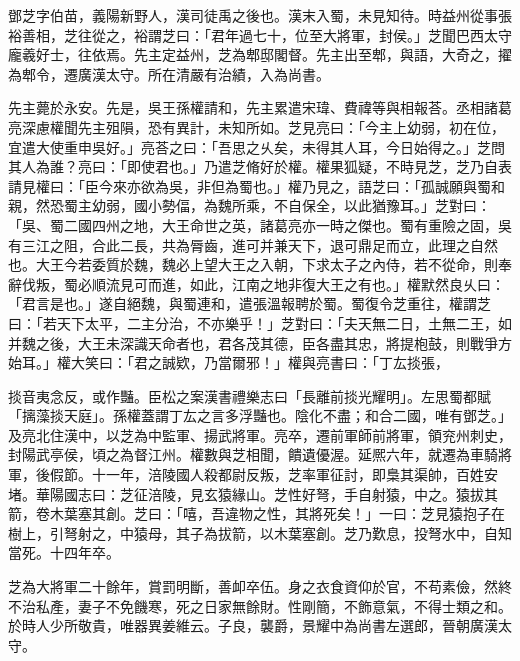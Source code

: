 
\begin{pinyinscope}
鄧芝字伯苗，義陽新野人，漢司徒禹之後也。漢末入蜀，未見知待。時益州從事張裕善相，芝往從之，裕謂芝曰：「君年過七十，位至大將軍，封侯。」芝聞巴西太守龐羲好士，往依焉。先主定益州，芝為郫邸閣督。先主出至郫，與語，大奇之，擢為郫令，遷廣漢太守。所在清嚴有治績，入為尚書。

先主薨於永安。先是，吳王孫權請和，先主累遣宋瑋、費禕等與相報荅。丞相諸葛亮深慮權聞先主殂隕，恐有異計，未知所如。芝見亮曰：「今主上幼弱，初在位，宜遣大使重申吳好。」亮荅之曰：「吾思之乆矣，未得其人耳，今日始得之。」芝問其人為誰？亮曰：「即使君也。」乃遣芝脩好於權。權果狐疑，不時見芝，芝乃自表請見權曰：「臣今來亦欲為吳，非但為蜀也。」權乃見之，語芝曰：「孤誠願與蜀和親，然恐蜀主幼弱，國小勢偪，為魏所乘，不自保全，以此猶豫耳。」芝對曰：「吳、蜀二國四州之地，大王命世之英，諸葛亮亦一時之傑也。蜀有重險之固，吳有三江之阻，合此二長，共為脣齒，進可并兼天下，退可鼎足而立，此理之自然也。大王今若委質於魏，魏必上望大王之入朝，下求太子之內侍，若不從命，則奉辭伐叛，蜀必順流見可而進，如此，江南之地非復大王之有也。」權默然良乆曰：「君言是也。」遂自絕魏，與蜀連和，遣張溫報聘於蜀。蜀復令芝重往，權謂芝曰：「若天下太平，二主分治，不亦樂乎！」芝對曰：「夫天無二日，土無二王，如并魏之後，大王未深識天命者也，君各茂其德，臣各盡其忠，將提枹鼓，則戰爭方始耳。」權大笑曰：「君之誠欵，乃當爾邪！」權與亮書曰：「丁厷掞張，

掞音夷念反，或作豔。臣松之案漢書禮樂志曰「長離前掞光耀明」。左思蜀都賦「摛藻掞天庭」。孫權蓋謂丁厷之言多浮豔也。陰化不盡；和合二國，唯有鄧芝。」及亮北住漢中，以芝為中監軍、揚武將軍。亮卒，遷前軍師前將軍，領兖州刺史，封陽武亭侯，頃之為督江州。權數與芝相聞，饋遺優渥。延熈六年，就遷為車騎將軍，後假節。十一年，涪陵國人殺都尉反叛，芝率軍征討，即梟其渠帥，百姓安堵。華陽國志曰：芝征涪陵，見玄猿緣山。芝性好弩，手自射猿，中之。猿拔其箭，卷木葉塞其創。芝曰：「嘻，吾違物之性，其將死矣！」一曰：芝見猿抱子在樹上，引弩射之，中猿母，其子為拔箭，以木葉塞創。芝乃歎息，投弩水中，自知當死。十四年卒。

芝為大將軍二十餘年，賞罰明斷，善卹卒伍。身之衣食資仰於官，不苟素儉，然終不治私產，妻子不免饑寒，死之日家無餘財。性剛簡，不飾意氣，不得士類之和。於時人少所敬貴，唯器異姜維云。子良，襲爵，景耀中為尚書左選郎，晉朝廣漢太守。


\end{pinyinscope}